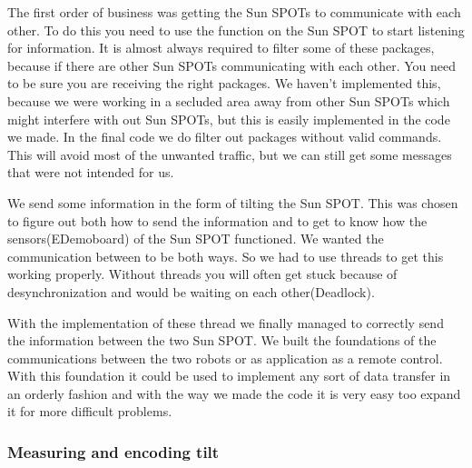 \documentclass[a4paper,10pt]{article} %
\begin{document}
The first order of business was getting the Sun SPOTs to communicate with each
other. To do this you need to use the function on the Sun SPOT to start
listening for information. It is almost always required to filter some of these
packages, because if there are other Sun SPOTs communicating with each other.
You need to be sure you are receiving the right packages. We haven't implemented
this, because we were working in a secluded area away from other Sun SPOTs which
might interfere with out Sun SPOTs, but this is easily implemented in the code
we made. In the final code we do filter out packages without valid commands.
This will avoid most of the unwanted traffic, but we can still get some messages
that were not intended for us.

We send some information in the form of tilting the Sun SPOT. This was chosen
to figure out both how to send the information and to get to know how the
sensors(EDemoboard) of the Sun SPOT functioned. We wanted the communication
between to be both ways. So we had to use threads to get this working properly.
Without threads you will often get stuck because of desynchronization and would
be waiting on each other(Deadlock).

With the implementation of these thread we finally managed to correctly send
the information between the two Sun SPOT. We built the foundations of the
communications between the two robots or as application as a remote control.
With this foundation it could be used to implement any sort of data transfer in
an orderly fashion and with the way we made the code it is very easy too expand
it for more difficult problems.

\subsubsection{Measuring and encoding tilt} %
\end{document}
